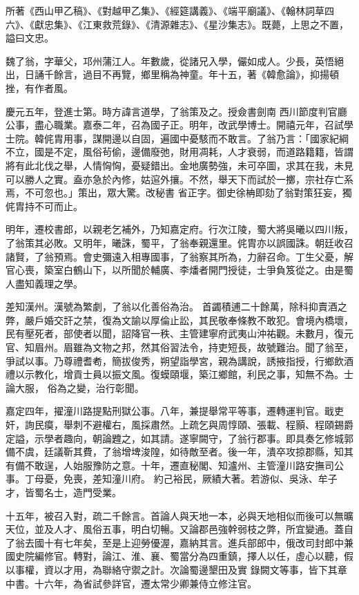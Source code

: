\begin{pinyinscope}
 所著《西山甲乙稿》、《對越甲乙集》、《經筵講義》、《端平廟議》、《翰林詞草四六》、《獻忠集》、《江東救荒錄》、《清源雜志》、《星沙集志》。既薨，上思之不置，謚曰文忠。



 魏了翁，字華父，邛州蒲江人。年數歲，從諸兄入學，儼如成人。少長，英悟絕出，日誦千餘言，過目不再覽，鄉里稱為神童。年十五，著《韓愈論》，抑揚頓挫，有作者風。



 慶元五年，登進士第。時方諱言道學，了翁策及之。授僉書劍南
 西川節度判官廳公事，盡心職業。嘉泰二年，召為國子正。明年，改武學博士。開禧元年，召試學士院。韓侂胄用事，謀開邊以自固，遍國中憂駭而不敢言。了翁乃言：「國家紀綱不立，國是不定，風俗茍偷，邊備廢弛，財用凋耗，人才衰弱，而道路籍籍，皆謂將有此北伐之舉，人情恟恟，憂疑錯出。金地廣勢強，未可卒圖，求其在我，未見可以勝人之實。盍亦急於內修，姑逭外攘。不然，舉天下而試於一擲，宗社存亡系焉，不可忽也。」策出，眾大驚。改秘書
 省正字。御史徐柟即劾了翁對策狂妄，獨侂胄持不可而止。



 明年，遷校書郎，以親老乞補外，乃知嘉定府。行次江陵，蜀大將吳曦以四川叛，了翁策其必敗。又明年，曦誅，蜀平，了翁奉親還里。侂胄亦以誤國誅。朝廷收召諸賢，了翁預焉。會史彌遠入相專國事，了翁察其所為，力辭召命。丁生父憂，解官心喪，築室白鶴山下，以所聞於輔廣、李燔者開門授徒，士爭負笈從之。由是蜀人盡知義理之學。



 差知漢州。漢號為繁劇，了翁以化善俗為治。
 首蠲積逋二十餘萬，除科抑賣酒之弊，嚴戶婚交訐之禁，復為文諭以厚倫止訟，其民敬奉條教不敢犯。會境內橋壞，民有壓死者，部使者以聞，詔降官一秩、主管建寧府武夷山沖祐觀。未數月，復元官、知眉州。眉雖為文物之邦，然其俗習法令，持吏短長，故號難治。聞了翁至，爭試以事。乃尊禮耆耇，簡拔俊秀，朔望詣學宮，親為講說，誘掖指授，行鄉飲酒禮以示教化，增貢士員以振文風。復蟆頤堰，築江鄉館，利民之事，知無不為。士論大服，
 俗為之變，治行彰聞。



 嘉定四年，擢潼川路提點刑獄公事。八年，兼提舉常平等事，遷轉運判官。戢吏奸，詢民瘼，舉刺不避權右，風採肅然。上疏乞與周惇頤、張載、程顥、程頤錫爵定謚，示學者趣向，朝論韙之，如其請。遂寧闕守，了翁行郡事。即具奏乞修城郭備不虞，廷議靳其費，了翁增埤浚隍，如待敵至者。後一年，潰卒攻掠郡縣，知其有備不敢逞，人始服豫防之意。十年，遷直秘閣、知瀘州、主管潼川路安撫司公事。丁母憂，免喪，差知潼川府。
 約己裕民，厥績大著。若游似、吳泳、牟子才，皆蜀名士，造門受業。



 十五年，被召入對，疏二千餘言。首論人與天地一本，必與天地相似而後可以無曠天位，並及人才、風俗五事，明白切暢。又論郡邑強幹弱枝之弊，所宜變通。蓋自了翁去國十有七年矣，至是上迎勞優渥，嘉納其言。進兵部郎中，俄改司封郎中兼國史院編修官。轉對，論江、淮、襄、蜀當分為四重鎮，擇人以任，虛心以聽，假以事權，資以才用，為聯絡守禦之計。次論蜀邊墾田及實
 錄闕文等事，皆下其章中書。十六年，為省試參詳官，遷太常少卿兼侍立修注官。




\end{pinyinscope}

